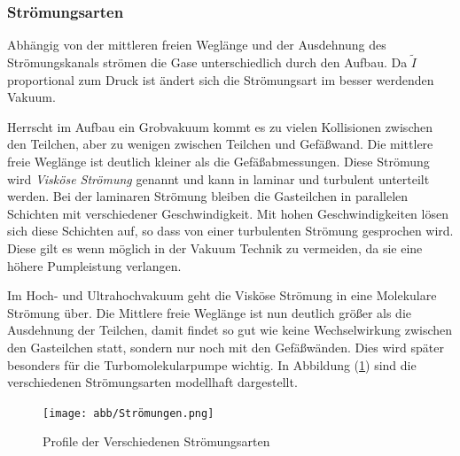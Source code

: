 \subsubsection*{Strömungsarten}
Abhängig von der mittleren freien Weglänge
und der Ausdehnung des Strömungskanals strömen die Gase unterschiedlich durch den Aufbau.
Da $\tilde{I}$ proportional zum Druck ist ändert sich die Strömungsart im besser werdenden Vakuum.

Herrscht im Aufbau ein Grobvakuum kommt es zu vielen Kollisionen zwischen den Teilchen,
aber zu wenigen zwischen Teilchen und Gefäßwand.
Die mittlere freie Weglänge ist deutlich kleiner als die Gefäßabmessungen.
Diese Strömung wird \textit{Visköse Strömung} genannt 
und kann in laminar und turbulent unterteilt werden.
Bei der laminaren Strömung bleiben die Gasteilchen in parallelen Schichten mit verschiedener Geschwindigkeit.
Mit hohen Geschwindigkeiten lösen sich diese Schichten auf, 
so dass von einer turbulenten Strömung gesprochen wird. 
Diese gilt es wenn möglich in der Vakuum Technik zu vermeiden,
da sie eine höhere Pumpleistung verlangen.

Im Hoch- und Ultrahochvakuum geht die Visköse Strömung in eine Molekulare Strömung über.
Die Mittlere freie Weglänge ist nun deutlich größer als die Ausdehnung der Teilchen,
damit findet so gut wie keine Wechselwirkung zwischen den Gasteilchen statt,
sondern nur noch mit den Gefäßwänden.
Dies wird später besonders für die Turbomolekularpumpe wichtig.
In Abbildung (\ref{fig:strömung}) sind die verschiedenen Strömungsarten modellhaft dargestellt.
\begin{figure}[h]
    \centering
    \texttt{[image: abb/Strömungen.png]}
    \caption{Profile der Verschiedenen Strömungsarten \cite{Pfeifer}}
    \label{fig:strömung}
\end{figure}

